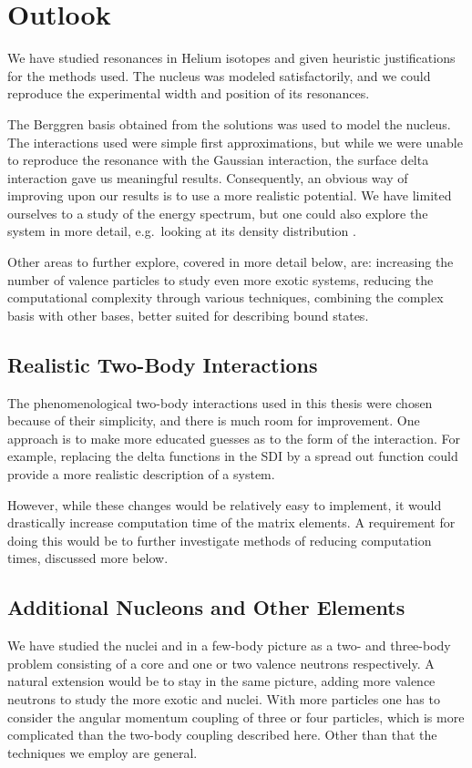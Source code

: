 \documentclass[../main/report.tex]{subfiles}
\begin{document}
\chapter{Outlook}
\label{cha:outlook}

We have studied resonances in Helium isotopes and given heuristic justifications for the methods used. The  nucleus was modeled satisfactorily, and we could reproduce the experimental width and position of its resonances.

The Berggren basis obtained from the  solutions was used to model the  nucleus. The interactions used were simple first approximations, but while we were unable to reproduce the  resonance with the Gaussian interaction, the surface delta interaction gave us meaningful results.
Consequently, an obvious way of improving upon our results is to use a more realistic potential. 
We have limited ourselves to a study of the energy spectrum, but one could also explore the  system in more detail, e.g.~looking at its density distribution \cite{radii}.

Other areas to further explore, covered in more detail below, are: increasing the number of valence particles to study even more exotic systems, reducing the computational complexity through various techniques, combining the complex basis with other bases, better suited for describing bound states.

\section{Realistic Two-Body Interactions}
The phenomenological two-body interactions used in this thesis were chosen because of their simplicity, and there is much room for improvement. 
One approach is to make more educated guesses as to the form of the interaction. 
For example, replacing the delta functions in the SDI by a spread out function could provide a more realistic description of a system. 

However, while these changes would be relatively easy to implement, it would drastically increase computation time of the matrix elements. 
A requirement for doing this would be to further investigate methods of reducing computation times, discussed more below.  

\section{Additional Nucleons and Other Elements}
We have studied the nuclei  and  in a few-body picture as a two- and three-body problem consisting of a core and one or two valence neutrons respectively.
A natural extension would be to stay in the same picture, adding more valence neutrons to study the more exotic  and  nuclei.
With more particles one has to consider the angular momentum coupling of three or four particles, which is more complicated than the two-body coupling described here. Other than that the techniques we employ are general.
\end{document}
